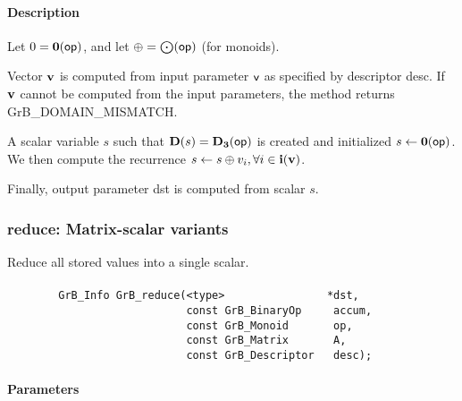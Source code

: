 \paragraph{Description}


Let $0 = \bold{0}({\sf op})$, and let $\oplus = \bigodot({\sf op})$ (for monoids).

Vector ${\bf v}$ is computed from input parameter ${\sf v}$ as
specified by descriptor {\sf desc}. If ${\bf v}$ cannot be computed
from the input parameters, the method returns {\sf GrB\_DOMAIN\_MISMATCH}.

A scalar variable $s$ such that $\bold{D}(s) = \bold{D_3}({\sf op})$ is
created and initialized $s \leftarrow \bold{0}({\sf op})$. 
We then compute the recurrence $s \leftarrow s \oplus v_i, \forall i \in {\bf i}({\bf v})$.

Finally, output parameter {\sf dst} is computed from scalar $s$.

\subsubsection{{\sf reduce}: Matrix-scalar variants}

Reduce all stored values into a single scalar.

\paragraph{\syntax}

\begin{verbatim}
        GrB_Info GrB_reduce(<type>                *dst,
                            const GrB_BinaryOp     accum,
                            const GrB_Monoid       op,
                            const GrB_Matrix       A,
                            const GrB_Descriptor   desc);
\end{verbatim}


\paragraph{Parameters}


